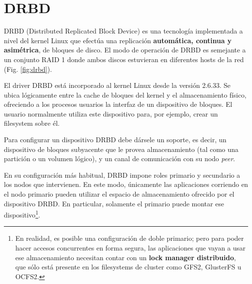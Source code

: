\section{DRBD}

DRBD (Distributed Replicated Block Device) es una tecnología implementada a nivel del kernel Linux que efectúa una replicación \textbf{automática, continua y asimétrica}, de bloques de disco. El modo de operación de DRBD es semejante a un conjunto RAID 1 donde ambos discos estuvieran en diferentes hosts de la red  (Fig. \ref{fig:drbd}). 

 
El driver DRBD está incorporado al kernel Linux desde la versión 2.6.33. Se ubica lógicamente entre la cache de bloques del kernel y el almacenamiento físico, ofreciendo a los procesos usuarios la interfaz de un dispositivo de bloques. El usuario normalmente utiliza este dispositivo para, por ejemplo, crear un filesystem sobre él. 

Para configurar un dispositivo DRBD debe dársele un soporte, es decir, un dispositivo de bloques subyacente que le provea almacenamiento (tal como una partición o un volumen lógico), y un canal de comunicación con su nodo \textit{peer}.
 
En su configuración más habitual, DRBD impone roles primario y secundario a los nodos que intervienen. En este modo, únicamente las aplicaciones corriendo en el nodo primario pueden utilizar el espacio de almacenamiento ofrecido por el dispositivo DRBD. En particular, solamente el primario puede montar ese dispositivo\footnote{En realidad, es posible una configuración de doble primario; pero para poder hacer accesos concurrentes en forma segura, las aplicaciones que vayan a usar ese almacenamiento necesitan contar con un \textbf{lock manager distribuido}, que sólo está presente en los filesystems de cluster como GFS2, GlusterFS u OCFS2.}.

